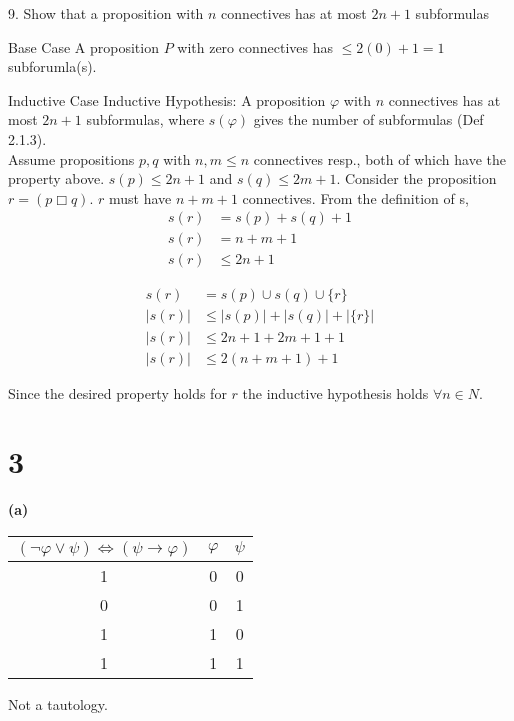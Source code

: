 \documentclass[10pt]{article}
\begin{document}
\begin{description*}
	\item[9.] Show that a proposition with $n$ connectives has at most $2n + 1$ subformulas

  \begin{description*}
  \item[Base Case] A proposition $P$ with zero connectives has $\leq 2(0) + 1 = 1$ subforumla(s).
  \item[Inductive Case] Inductive Hypothesis: A proposition $\varphi$ with $n$ connectives has at most $2n + 1$ subformulas, where $s(\varphi)$ gives the number of subformulas (Def 2.1.3).\\
  Assume propositions $p,q$ with $n,m \leq n$ connectives resp., both of which have the property above. $s(p) \leq 2n+1$ and $s(q) \leq 2m+1$. Consider the proposition $r = (p \Box q)$. $r$ must have $n+m+1$ connectives. From the definition of s,
  \begin{align*}
  s(r) &= s(p) + s(q) + 1\\
  s(r) &= n + m + 1 \\
  s(r) &\leq 2n + 1
  \end{align*}


  \begin{align*}
	s(r) &= s(p) \cup s(q) \cup \{r\} \\
	|s(r)| &\leq |s(p)| + |s(q)| + |\{r\}| \\
	|s(r)| &\leq 2n + 1 + 2m + 1 + 1 \\
	|s(r)| &\leq 2(n+m+1)+1
  \end{align*}
  
  Since the desired property holds for $r$ the inductive hypothesis holds $\forall n \in N$.
  \end{description*}

\end{description*}


\section*{3}

\textbf{(a)}

\begin{tabular}{ c || c | c }			
  $(\lnot \varphi \lor \psi) \iff (\psi \to \varphi)$ & $\varphi$ & $\psi$ \\
  \hline
  1 & 0 & 0 \\
  0 & 0 & 1 \\
  1 & 1 & 0 \\
  1 & 1 & 1 \\
  \hline  
\end{tabular}
Not a tautology.\\
\end{document}
